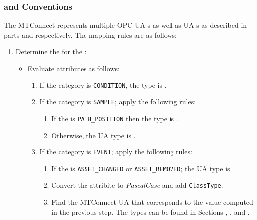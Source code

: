 \subsubsection{  and  Conventions}
    \label{sec:data-item-conventions}

The MTConnect  represents multiple OPC UA s as well as UA s as described in parts \cite{UAPart8} and \cite{UAPart9} respectively. The mapping rules are as follows:

\begin{enumerate}
\item Determine the   for the  :
    \begin{itemize}
    \item Evaluate  attributes as follows:
        \begin{enumerate}
        \setlength\itemsep{1em}
        \item If the category is \texttt{CONDITION}, the type is .
        
        \item If the category is \texttt{SAMPLE}; apply the following rules:
            \begin{enumerate}
            \item If the  is \texttt{PATH_POSITION} then the type is .
            \item Otherwise, the UA type is .
            \end{enumerate}
            
        \item If the category is \texttt{EVENT}; apply the following rules:
            \begin{enumerate}
            \setlength\itemsep{1em}
            \item If the  is \texttt{ASSET_CHANGED} or \texttt{ASSET_REMOVED}; the UA type is 
            
            \item Convert the  attribite to \textit{PascalCase} and add \texttt{ClassType}.
            
            \item Find the MTConnect UA  that corresponds to the value computed in the previous step.
            The types can be found in Sections , , and .
            

\end{enumerate}
\end{enumerate}
\end{itemize}
\end{enumerate}
